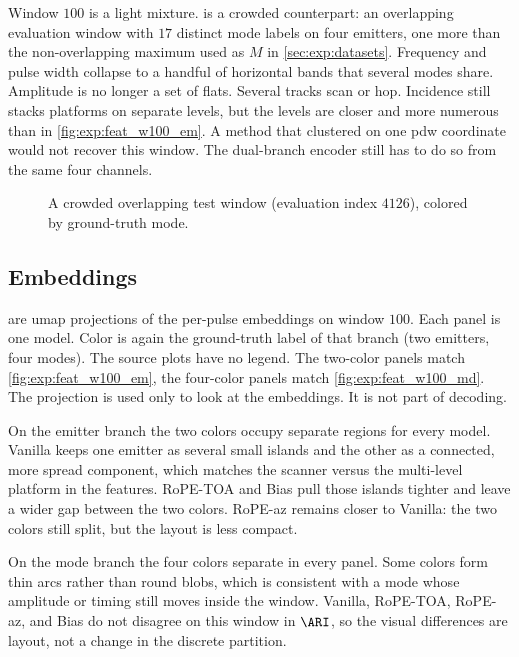 Window $100$ is a light mixture.
 is a crowded counterpart: an overlapping evaluation window with $17$ distinct mode labels on four emitters, one more than the non-overlapping maximum used as $M$ in \cref{sec:exp:datasets}.
Frequency and pulse width collapse to a handful of horizontal bands that several modes share.
Amplitude is no longer a set of flats. Several tracks scan or hop.
Incidence still stacks platforms on separate levels, but the levels are closer and more numerous than in \cref{fig:exp:feat_w100_em}.
A method that clustered on one \gls{pdw} coordinate would not recover this window.
The dual-branch encoder still has to do so from the same four channels.

\begin{figure}[tbp]
  \centering
  \caption{A crowded overlapping test window (evaluation index $4126$), colored by ground-truth mode.}
  \label{fig:exp:feat_maxmode}
\end{figure}

\subsection*{Embeddings}\label{sec:exp:qualitative:embed}

 are \gls{umap} projections of the per-pulse embeddings on window $100$.
Each panel is one model.
Color is again the ground-truth label of that branch (two emitters, four modes).
The source plots have no legend. The two-color panels match \cref{fig:exp:feat_w100_em}, the four-color panels match \cref{fig:exp:feat_w100_md}.
The projection is used only to look at the embeddings. It is not part of decoding.

On the emitter branch the two colors occupy separate regions for every model.
Vanilla keeps one emitter as several small islands and the other as a connected, more spread component, which matches the scanner versus the multi-level platform in the features.
RoPE-TOA and Bias pull those islands tighter and leave a wider gap between the two colors.
RoPE-az remains closer to Vanilla: the two colors still split, but the layout is less compact.

On the mode branch the four colors separate in every panel.
Some colors form thin arcs rather than round blobs, which is consistent with a mode whose amplitude or timing still moves inside the window.
Vanilla, RoPE-TOA, RoPE-az, and Bias do not disagree on this window in $\ARI$, so the visual differences are layout, not a change in the discrete partition.

